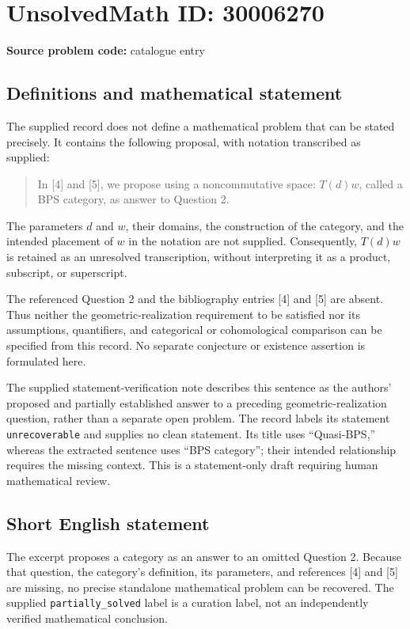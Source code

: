 \documentclass[11pt]{article}
\begin{document}
\section*{UnsolvedMath ID: 30006270}
\textbf{Source problem code:} catalogue entry
\subsection{Definitions and mathematical statement}
The supplied record does not define a mathematical problem that can be stated precisely. It contains the following proposal, with notation transcribed as supplied:
\begin{quote}
In [4] and [5], we propose using a noncommutative space: \(T(d)w\), called a BPS category, as answer to Question 2.
\end{quote}
The parameters \(d\) and \(w\), their domains, the construction of the category, and the intended placement of \(w\) in the notation are not supplied. Consequently, \(T(d)w\) is retained as an unresolved transcription, without interpreting it as a product, subscript, or superscript.

The referenced Question 2 and the bibliography entries [4] and [5] are absent. Thus neither the geometric-realization requirement to be satisfied nor its assumptions, quantifiers, and categorical or cohomological comparison can be specified from this record. No separate conjecture or existence assertion is formulated here.

The supplied statement-verification note describes this sentence as the authors' proposed and partially established answer to a preceding geometric-realization question, rather than a separate open problem. The record labels its statement \texttt{unrecoverable} and supplies no clean statement. Its title uses ``Quasi-BPS,'' whereas the extracted sentence uses ``BPS category''; their intended relationship requires the missing context. This is a statement-only draft requiring human mathematical review.
\subsection{Short English statement}
The excerpt proposes a category as an answer to an omitted Question 2. Because that question, the category's definition, its parameters, and references [4] and [5] are missing, no precise standalone mathematical problem can be recovered. The supplied \texttt{partially\_solved} label is a curation label, not an independently verified mathematical conclusion.
\end{document}
